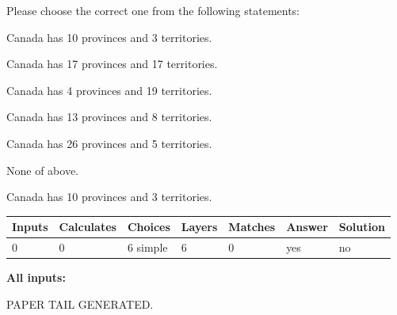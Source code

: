 \documentclass[12pt]{article}
\begin{document}
  
Please choose the correct one from the following statements:
 
 
Canada has 10  provinces and 3 territories.
 
 
Canada has  17 provinces and  17 territories.
 
 
Canada has   4 provinces and  19 territories.
 
 
Canada has  13 provinces and  8 territories.
 
 
Canada has  26 provinces and  5 territories.
 
 
 None of above.
 
 
\noindent{}
 
 
Canada has 10  provinces and 3 territories.
 
 
\noindent{}
 
 
   
   
   
   
\noindent\begin{tabular}{|l|l|l|l|l|l|l|}
 \hline
Inputs & Calculates & Choices & Layers & Matches & Answer & Solution \\ \hline
 0  & 
 0  & 
 6
  simple  
  & 
 6  & 
 0  & 
  yes & 
  no 
  \\ \hline
 \end{tabular}
   
   
   
   
\noindent{}
   
   
   
   
\noindent\vspace{0.1in}\hspace{-0.08in} {\textbf{\Large{All inputs: }}}
   
   
   
   
   
   
 \vspace{0.2in}
 
   
   
\vspace{2.0in} PAPER TAIL GENERATED.
   
   
   
\end{document}
